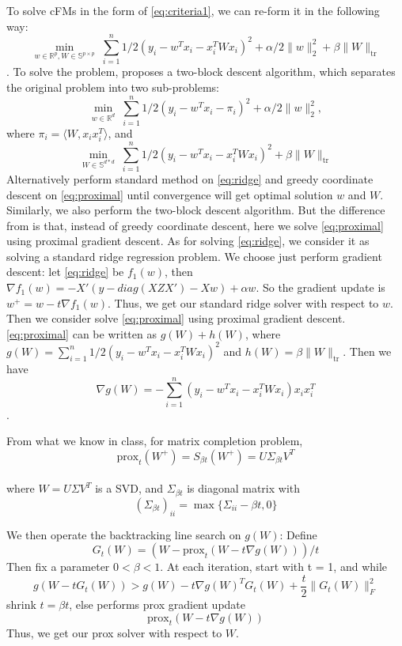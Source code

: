 \documentclass{article}
\newcommand{\prox}{\text{prox}}
\begin{document}
To solve cFMs in the form of \cref{eq:criteria1}, we can re-form it in the following way:
\begin{equation}
\label{eq:eq5}
 \min_{w \in \mathbb{R}^{p}, W \in \mathbb{S}^{p \times p}} \;
\sum_{i = 1}^n 1/2(y_i-w^T x_i-x_i^T W x_i)^2 + \alpha /2 \|w\|_2^2 + \beta\|W\|_{\text{tr}}
\end{equation}
. To solve the problem, \cite{convexFM_paper} proposes a two-block descent algorithm, which separates the original problem into two sub-problems:
\begin{equation}
\label{eq:ridge}
 \min_{w \in \mathbb{R}^{d}} \;
\sum_{i = 1}^n 1/2(y_i-w^T x_i-\pi_i)^2 + \alpha /2 \|w\|_2^2,
\end{equation}
where $\pi_i=\langle W,x_i x_i^T\rangle$, and
\begin{equation}
\label{eq:proximal}
 \min_{W \in \mathbb{S}^{d*d}} \;
\sum_{i = 1}^n 1/2(y_i-w^T x_i-x_i^T W x_i)^2 + \beta\|W\|_{\text{tr}}
\end{equation}
Alternatively perform standard method on \cref{eq:ridge} and greedy coordinate descent on \cref{eq:proximal} until convergence will get optimal solution $w$ and $W$.
Similarly, we also perform the two-block descent algorithm. But the difference from \cite{convexFM_paper} is that, instead of greedy coordinate descent, here we solve \cref{eq:proximal} using proximal gradient descent. As for solving \cref{eq:ridge}, we consider it as solving a standard ridge regression problem.
We choose just perform gradient descent: let \cref{eq:ridge} be $f_1(w)$, then
$\nabla f_1(w)=-X'(y-diag(XZX')-Xw)+\alpha w$. So the gradient update is $w^+=w-t\nabla f_1(w)$. Thus, we get our standard ridge solver with respect to $w$.
Then we consider solve \cref{eq:proximal} using proximal gradient descent. \cref{eq:proximal} can be written as $g(W)+h(W)$, where $g(W)=\sum_{i = 1}^n 1/2(y_i-w^T x_i-x_i^T W x_i)^2$ and
$h(W)=\beta\|W\|_{\text{tr}}$. Then we have
$$\nabla g(W)=-\sum_{i = 1}^n(y_i-w^T x_i-x_i^T W x_i)x_i x_i^T$$.
 
From what we know in class, for matrix completion problem,
$$\prox_t(W^{+})=S_{\beta t}(W^{+})=U\Sigma_{\beta t} V^T$$\\
where $W=U\Sigma V^T$ is a SVD, and $\Sigma_{\beta t}$ is diagonal matrix with $$(\Sigma_{\beta t})_{ii}=\max\{\Sigma_{ii}-\beta t,0\}$$
 
We then operate the backtracking line search on $g(W)$:
Define
$$G_t(W)=\left(W-\prox_t(W-t\nabla g(W))\right)/t$$
Then fix a parameter $0 <\beta < 1$. At each iteration, start with t = 1, and while
$$g(W-tG_t(W))>g(W)-t\nabla g(W)^T G_t(W)+\frac{t}{2}\|G_t(W)\|_F^2$$
shrink $t=\beta t$, else performs prox gradient update
$$\prox_t(W-t\nabla g(W))$$
Thus, we get our prox solver with respect to $W$.
 
\end{document}
